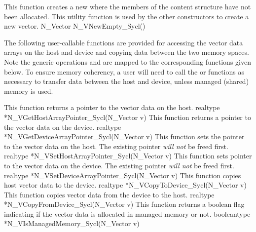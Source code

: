 {
  This function creates a new {\nvecsycl} where the members of the content
  structure have not been allocated. This utility function is used by the
  other constructors to create a new vector.
}
{
  N\_Vector N\_VNewEmpty\_Sycl()
}

The following user-callable functions are provided for accessing the vector data
arrays on the host and device and copying data between the two memory spaces.
Note the generic {\nvector} operations  and
 are mapped to the corresponding 
functions given below. To ensure memory coherency, a user will need to call the
 or  functions as necessary to transfer data between the
host and device, unless managed (shared) memory is used.

{
  This function returns a pointer to the vector data on the host.
}
{
  realtype *N\_VGetHostArrayPointer\_Sycl(N\_Vector v)
}
{
  This function returns a pointer to the vector data on the device.
}
{
  realtype *N\_VGetDeviceArrayPointer\_Sycl(N\_Vector v)
}
{
  This function sets the pointer to the vector data on the host.
  The existing pointer \textit{will not} be freed first.
}
{
  realtype *N\_VSetHostArrayPointer\_Sycl(N\_Vector v)
}
{
  This function sets pointer to the vector data on the device.
  The existing pointer \textit{will not} be freed first.
}
{
  realtype *N\_VSetDeviceArrayPointer\_Sycl(N\_Vector v)
}
{
 This function copies host vector data to the device.
}
{
 realtype *N\_VCopyToDevice\_Sycl(N\_Vector v)
}
{
  This function copies vector data from the device to the host.
}
{
  realtype *N\_VCopyFromDevice\_Sycl(N\_Vector v)
}
{
  This function returns a boolean flag indicating if the vector
  data is allocated in managed memory or not.
}
{
  booleantype *N\_VIsManagedMemory\_Sycl(N\_Vector v)
}

